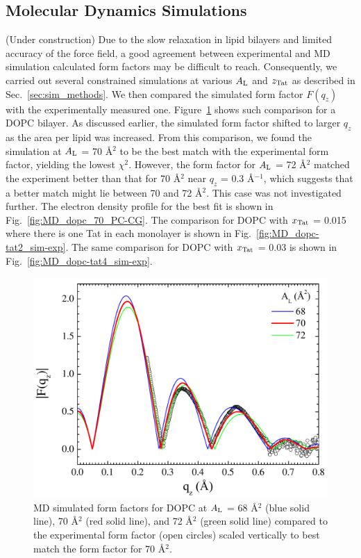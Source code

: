 \subsection{Molecular Dynamics Simulations}\label{sec:sim_results}
(Under construction)
Due to the slow relaxation in lipid bilayers and limited accuracy of the force 
field, a good agreement between experimental and MD simulation calculated 
form factors may be difficult to reach. Consequently, we carried out several 
constrained simulations at various $A_\textrm{L}$ and $z_\textrm{Tat}$ as described
in Sec.~\ref{sec:sim_methods}. 
We then compared the simulated form factor $F(q_z)$ with the
experimentally measured one. Figure~\ref{fig:MD_dopc_sim-exp} shows such
comparison for a DOPC bilayer. As discussed earlier, the simulated form factor
shifted to larger $q_z$ as the area per lipid was increased. 
From this comparison, we found the simulation
at $A_\textrm{L}$ = 70 \AA$^2$ to be the best match with the experimental form
factor, yielding the lowest $\chi^2$. 
However, the form factor for $A_\textrm{L}$ = 72 \AA$^2$ matched the experiment
better than that for 70 \AA$^2$ near $q_z$ = 0.3 \AA$^{-1}$, which 
suggests that a better match might lie between 70 and 72 \AA$^2$. 
This case was not investigated further.
The electron density profile for the best fit is shown in 
Fig.~\ref{fig:MD_dopc_70_PC-CG}.
The comparison for DOPC with $x_\textrm{Tat}$ = 0.015 where there is one Tat in
each monolayer is shown in Fig.~\ref{fig:MD_dopc-tat2_sim-exp}. The
same comparison for DOPC with $x_\textrm{Tat}$ = 0.03 is shown in 
Fig.~\ref{fig:MD_dopc-tat4_sim-exp}.

\begin{figure}[htbp]
  \centering
  \includegraphics[width=1.0\textwidth]{figures/Tat/MD_Results/xff/dopc_sim-exp}
  \caption{MD simulated form factors for DOPC at $A_\textrm{L}$ = 68 \AA$^2$ (blue solid line), 
  70 \AA$^2$ (red solid line), and 72 \AA$^2$ (green solid line)
  compared to the experimental form factor (open circles) scaled vertically
  to best match the form factor for 70 \AA$^2$.}
  \label{fig:MD_dopc_sim-exp}
\end{figure}

